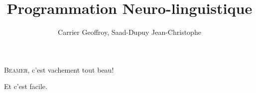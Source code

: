 \documentclass{beamer}
\title{Programmation Neuro-linguistique}
\author{Carrier Geoffroy, Saad-Dupuy Jean-Christophe}\institute{L3-MIAGE}
\begin{document}
  \begin{frame}
  \titlepage
  \end{frame}

  \begin{frame}
  \textsc{Beamer}, c'est vachement tout beau!
  \end{frame}

  \begin{frame}
  Et c'est facile.
  \end{frame}

  
\end{document}
